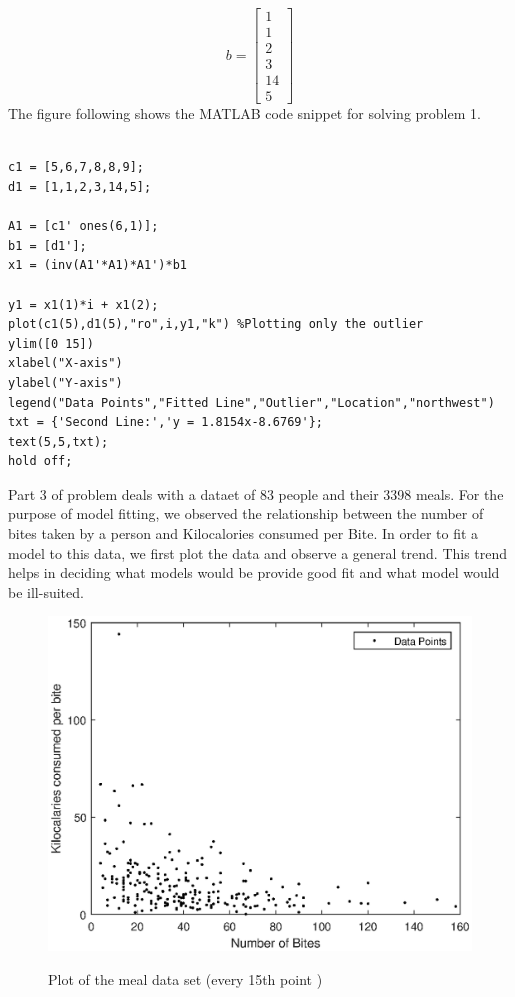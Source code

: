 \documentclass{article}
\begin{document}
\begin{equation}\label{eqn16}
b = 
\begin{bmatrix}
1\\1\\2\\3\\14\\5
\end{bmatrix}
\end{equation}
 The figure following shows the MATLAB code snippet for solving problem 1.\\
\begin{lstlisting}[frame=single]
% Part 2 

c1 = [5,6,7,8,8,9];
d1 = [1,1,2,3,14,5];

A1 = [c1' ones(6,1)];
b1 = [d1'];
x1 = (inv(A1'*A1)*A1')*b1

y1 = x1(1)*i + x1(2);
plot(c1(5),d1(5),"ro",i,y1,"k") %Plotting only the outlier
ylim([0 15])
xlabel("X-axis")
ylabel("Y-axis")
legend("Data Points","Fitted Line","Outlier","Location","northwest")
txt = {'Second Line:','y = 1.8154x-8.6769'};
text(5,5,txt);
hold off;
\end{lstlisting}
\pagebreak
Part 3 of problem deals with a dataet of 83 people and their 3398 meals. For the purpose of model fitting, we observed the relationship between the number of bites taken by a person and Kilocalories consumed per Bite. In order to fit a model to this data, we first plot the data and observe a general trend. This trend helps in deciding what models would be provide good fit and what model would be ill-suited.\\
\begin{figure}[!htb]
\centering
\includegraphics[scale=0.8]{meal_data_15th.eps}
\label{plt:1}
\caption{Plot of the meal data set (\small{every 15th point })}
\end{figure}
\end{document}
